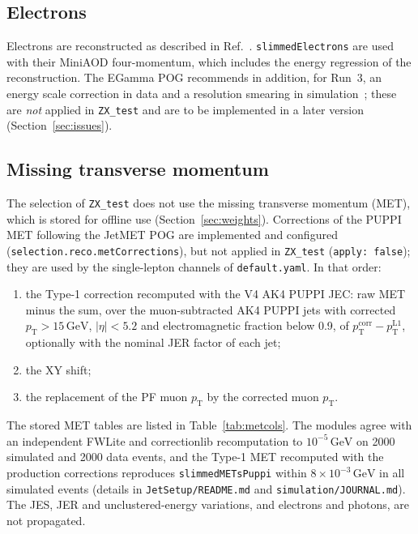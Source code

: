 \documentclass[11pt]{article}
\newcommand{\pt}{p_{\mathrm{T}}}
\newcommand{\GeV}{\ensuremath{\,\mathrm{GeV}}}
\newcommand{\code}[1]{\texttt{#1}}
\begin{document}
\subsection{Electrons}
Electrons are reconstructed as described in Ref.~\cite{CMS:2020uim}. \code{slimmedElectrons} are used with their
MiniAOD four-momentum, which includes the energy regression of the reconstruction. The EGamma POG recommends in
addition, for Run~3, an energy scale correction in data and a resolution smearing in simulation~\cite{EGMsas}; these are
\emph{not} applied in \code{ZX\_test} and are to be implemented in a later version (Section~\ref{sec:issues}).

\subsection{Missing transverse momentum}
\label{sec:met}
The selection of \code{ZX\_test} does not use the missing transverse momentum (MET), which is stored for offline use
(Section~\ref{sec:weights}). Corrections of the PUPPI MET following the JetMET POG are implemented and configured
(\code{selection.reco.metCorrections}), but not applied in \code{ZX\_test} (\code{apply: false}); they are used by the
single-lepton channels of \code{default.yaml}. In that order:
\begin{enumerate}
\item the Type-1 correction recomputed with the V4 AK4 PUPPI JEC: raw MET minus the sum, over the muon-subtracted AK4
  PUPPI jets with corrected $\pt > 15\GeV$, $|\eta| < 5.2$ and electromagnetic fraction below 0.9, of
  $\pt^\mathrm{corr} - \pt^\mathrm{L1}$, optionally with the nominal JER factor of each jet;
\item the XY shift;
\item the replacement of the PF muon $\pt$ by the corrected muon $\pt$.
\end{enumerate}
The stored MET tables are listed in Table~\ref{tab:metcols}. The modules agree with an
independent FWLite and correctionlib recomputation to $10^{-5}\GeV$ on 2000 simulated and 2000 data events, and the
Type-1 MET recomputed with the production corrections reproduces \code{slimmedMETsPuppi} within $8\times10^{-3}\GeV$ in
all simulated events (details in \code{JetSetup/README.md} and \code{simulation/JOURNAL.md}). The JES, JER and
unclustered-energy variations, and electrons and photons, are not propagated.
\end{document}
